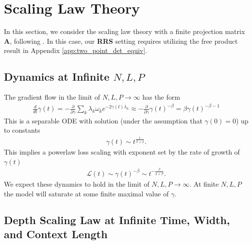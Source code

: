 \documentclass{article} %
\begin{document}
\section{Scaling Law Theory}

In this section, we consider the scaling law theory with a finite projection matrix $\bm A$, following \cite{bordelon2024dynamical}. In this case, our \textbf{RRS} setting requires utilizing the free product result in Appendix \ref{app:two_point_det_equiv}.  


\subsection{Dynamics at Infinite $N,L,P$} 

The gradient flow in the limit of $N , L , P \to \infty$ has the form 
\begin{align}
    \frac{d}{dt} \gamma(t) = - \frac{\partial}{\partial \gamma} \sum_k  \lambda_k \omega_k  e^{- 2 \gamma(t) \lambda_k  } \approx  - \frac{\partial}{\partial \gamma}  \gamma(t)^{- \beta } = \beta \gamma(t)^{- \beta - 1 }
\end{align}
This is a separable ODE with solution (under the assumption that $\gamma(0) = 0$) up to constants
\begin{align}
    \gamma(t) \sim t^{ \frac{1}{\beta + 2} }  .
\end{align}
This implies a powerlaw loss scaling with exponent set by the rate of growth of $\gamma(t)$
\begin{align}
    \mathcal L(t) \sim    \gamma(t)^{-\beta } \sim t^{- \frac{\beta}{2+\beta }} .
\end{align}
We expect these dynamics to hold in the limit of $N ,L , P \to \infty$. At finite $N,L,P$ the model will saturate at some finite maximal value of $\gamma$. 

\subsection{Depth Scaling Law at Infinite Time, Width, and Context Length}
\end{document}
